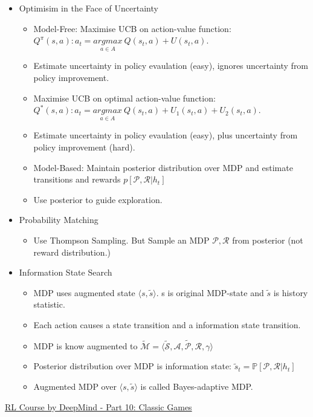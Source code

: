 \begin{itemize}
\begin{itemize}[noitemsep,nolistsep]
\begin{itemize}
		\end{itemize}
		\item Optimisim in the Face of Uncertainty
		\begin{itemize}[noitemsep,nolistsep]
			\item Model-Free: Maximise UCB on action-value function: $Q^\pi(s,a): a_t = \underset{a \in A}{argmax}\ Q(s_t,a) + U(s_t,a)$. 
			\item Estimate uncertainty in policy evaulation (easy), ignores uncertainty from policy improvement.
			\item Maximise UCB on optimal action-value function: $Q^*(s,a): a_t = \underset{a \in A}{argmax}\ Q(s_t,a) + U_1(s_t,a) + U_2(s_t,a)$. 
			\item Estimate uncertainty in policy evaulation (easy), plus uncertainty from policy improvement (hard).
			\item Model-Based: Maintain posterior distribution over MDP and estimate transitions and rewards $p[\mathcal{P,R}|h_t]$
			\item Use posterior to guide exploration.
		\end{itemize}
		\item Probability Matching
		\begin{itemize}[noitemsep,nolistsep]
			\item Use Thompson Sampling. But Sample an MDP $\mathcal{P,R}$ from posterior (not reward distribution.)
		\end{itemize}
		\item Information State Search
		\begin{itemize}[noitemsep,nolistsep]
			\item MDP uses augmented state $\langle s, \tilde{s} \rangle$. s is original MDP-state and $\tilde{s}$ is history statistic.
			\item Each action causes a state transition and a information state transition.
			\item MDP is know augmented to $\mathcal{\tilde{M} = \langle \tilde{S}, A, \tilde{P}, R }, \gamma \rangle$
			\item Posterior distribution over MDP is information state: $\tilde{s}_t = \mathbb{P}[\mathcal{P,R}|h_t]$
			\item Augmented MDP over $\langle s,\tilde{s} \rangle$ is called Bayes-adaptive MDP.
		\end{itemize}
	\end{itemize}
\end{itemize}
\href{https://www.youtube.com/watch?v=sGuiWX07sKw}{RL Course by DeepMind - Part 10: Classic Games}
